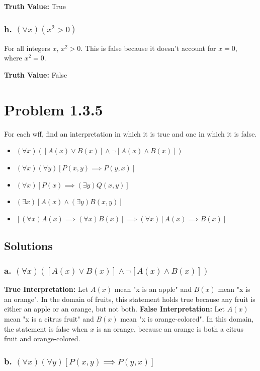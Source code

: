 \documentclass[12pt]{article}
\begin{document}
\textbf{Truth Value:} True


\subsubsection*{h. \((\forall x)(x^2 > 0)\)}
For all integers \( x \), \( x^2 > 0 \). This is false because it doesn't account for \( x = 0 \), where \( x^2 = 0 \).

\textbf{Truth Value:} False
\newpage
\section*{Problem 1.3.5}
For each wff, find an interpretation in which it is true and one in which it is false.
\begin{itemize}
    \item[a.] \((\forall x)([A(x) \lor B(x)] \land \lnot [A(x) \land B(x)])\)
    \item[b.] \((\forall x)(\forall y)[P(x, y) \implies P(y, x)]\)
    \item[c.] \((\forall x)[P(x) \implies (\exists y)Q(x, y)]\)
    \item[d.] \((\exists x)[A(x) \land (\exists y)B(x, y)]\)
    \item[e.] \([( \forall x)A(x) \implies (\forall x)B(x)] \implies (\forall x)[A(x) \implies B(x)]\)
\end{itemize}

\subsection*{Solutions}

\subsubsection*{a. \((\forall x)([A(x) \lor B(x)] \land \lnot [A(x) \land B(x)])\)}

\textbf{True Interpretation:} Let \(A(x)\) mean "x is an apple" and \(B(x)\) mean "x is an orange". In the domain of fruits, this statement holds true because any fruit is either an apple or an orange, but not both.
\newline
\textbf{False Interpretation:} Let \(A(x)\) mean "x is a citrus fruit" and \(B(x)\) mean "x is orange-colored". In this domain, the statement is false when \(x\) is an orange, because an orange is both a citrus fruit and orange-colored.


\subsubsection*{b. \((\forall x)(\forall y)[P(x, y) \implies P(y, x)]\)}
\end{document}
